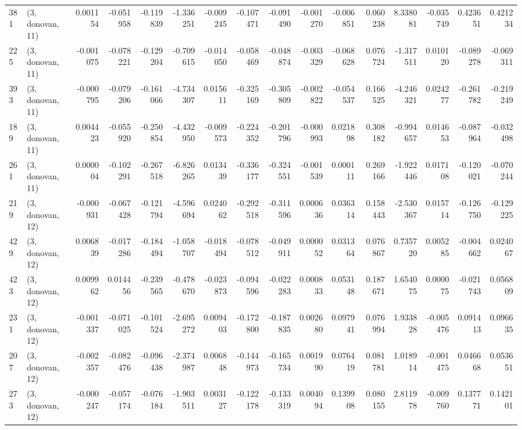 \begin{tabular}{llrrrrrrrrrrrrrr}
381 &  (3, donovan, 11) &   0.001154 & -0.051958 & -0.119839 &   -1.336251 & -0.009245 &  -0.107471 & -0.091490 & -0.001270 & -0.006851 &  0.060238 &    8.338081 & -0.035749 &  0.423651 &  0.421234 \\
225 &  (3, donovan, 11) &  -0.001075 & -0.078221 & -0.129204 &   -0.709615 & -0.014050 &  -0.058469 & -0.048874 & -0.003329 & -0.068628 &  0.076724 &   -1.317511 &  0.010120 & -0.089278 & -0.069311 \\
393 &  (3, donovan, 11) &  -0.000795 & -0.079206 & -0.161066 &   -4.734307 &  0.015611 &  -0.325169 & -0.305809 & -0.002822 & -0.054537 &  0.166525 &   -4.246321 &  0.024277 & -0.261782 & -0.219249 \\
189 &  (3, donovan, 11) &   0.004423 & -0.055920 & -0.250854 &   -4.432950 & -0.009573 &  -0.224352 & -0.201796 & -0.000993 &  0.021898 &  0.308182 &   -0.994657 &  0.014653 & -0.087964 & -0.032498 \\
261 &  (3, donovan, 11) &   0.000004 & -0.102291 & -0.267518 &   -6.826265 &  0.013439 &  -0.336177 & -0.324551 & -0.001539 &  0.000111 &  0.269166 &   -1.922446 &  0.017108 & -0.120021 & -0.070244 \\
219 &  (3, donovan, 12) &  -0.000931 & -0.067428 & -0.121794 &   -4.596694 &  0.024062 &  -0.292518 & -0.311596 &  0.000636 &  0.036314 &  0.158443 &   -2.530367 &  0.015714 & -0.126750 & -0.129225 \\
429 &  (3, donovan, 12) &   0.006839 & -0.017286 & -0.184494 &   -1.058707 & -0.018494 &  -0.078512 & -0.049911 &  0.000052 &  0.031364 &  0.076867 &    0.735720 &  0.005285 & -0.004662 &  0.024067 \\
423 &  (3, donovan, 12) &   0.009962 &  0.014456 & -0.239565 &   -0.478670 & -0.023873 &  -0.094596 & -0.022283 &  0.000833 &  0.053148 &  0.187671 &    1.654075 &  0.000075 & -0.021743 &  0.056809 \\
231 &  (3, donovan, 12) &  -0.001337 & -0.071025 & -0.101524 &   -2.695272 &  0.009403 &  -0.172800 & -0.187835 &  0.002680 &  0.097941 &  0.076994 &    1.933828 & -0.005476 &  0.091413 &  0.096635 \\
207 &  (3, donovan, 12) &  -0.002357 & -0.082476 & -0.096438 &   -2.374987 &  0.006848 &  -0.144973 & -0.165734 &  0.001990 &  0.076419 &  0.081781 &    1.018914 & -0.001475 &  0.046668 &  0.053651 \\
273 &  (3, donovan, 12) &  -0.000247 & -0.057174 & -0.076184 &   -1.903511 &  0.003127 &  -0.122178 & -0.133319 &  0.004094 &  0.139908 &  0.080155 &    2.811978 & -0.009760 &  0.137771 &  0.142101 \\

\end{tabular}
